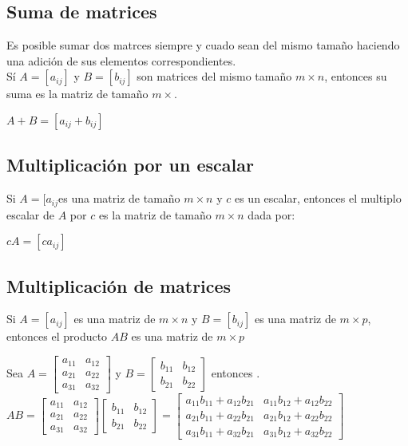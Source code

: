 \subsection{Suma de matrices}
Es posible sumar dos matrces siempre y cuado sean del mismo tamaño haciendo una adici\'on de sus elementos correspondientes.\\
S\'i $A=[a_{ij}]$ y $B=[b_{ij}]$ son matrices del mismo tamaño $m \times n$, entonces su suma es la matriz de tamaño $m \times $. \\
\begin{center}
$A+B=[a_{ij}+b_{ij}]$
\end{center}
\subsection{Multiplicaci\'on por un escalar}
Si $A=[a_{ij}$es una matriz de tamaño $m \times n$ y $c$ es un escalar, entonces el multiplo escalar de $A$ por $c$ es la matriz de tamaño $m \times n$ dada por:
\begin{center}
$cA=[ca_{ij}]$
\end{center}  
\subsection{Multiplicaci\'on de matrices}
Si $A=[a_{ij}]$ es una matriz de $m \times n$ y $B=[b_{ij}]$ es una matriz de $m \times p$, entonces el producto $AB$ es una matriz de $m \times p$
\begin{center}
Sea $A=\begin{bmatrix}
a_{11} & a_{12}\\
a_{21} & a_{22}\\
a_{31} & a_{32}
\end{bmatrix}$ y $B=\begin{bmatrix}
b_{11} & b_{12}\\
b_{21} & b_{22}
\end{bmatrix}$ entonces \bigskip \bigskip .
$AB=\begin{bmatrix}
a_{11} & a_{12}\\
a_{21} & a_{22}\\
a_{31} & a_{32}
\end{bmatrix}
\begin{bmatrix}
b_{11} & b_{12}\\
b_{21} & b_{22}
\end{bmatrix}=
\begin{bmatrix}
a_{11}b_{11}+a_{12}b_{21} & a_{11}b_{12}+a_{12}b_{22}\\
a_{21}b_{11}+a_{22}b_{21} & a_{21}b_{12}+a_{22}b_{22}\\
a_{31}b_{11}+a_{32}b_{21} & a_{31}b_{12}+a_{32}b_{22}
\end{bmatrix}$
\end{center}
